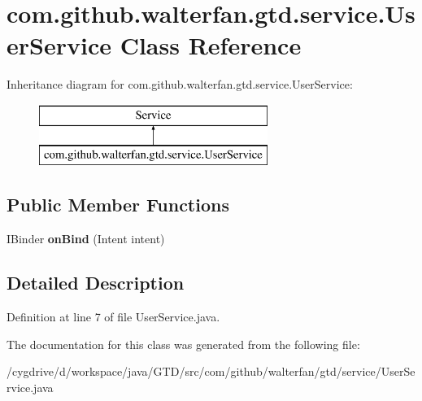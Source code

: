 \hypertarget{classcom_1_1github_1_1walterfan_1_1gtd_1_1service_1_1UserService}{\section{com.\-github.\-walterfan.\-gtd.\-service.\-User\-Service Class Reference}
\label{classcom_1_1github_1_1walterfan_1_1gtd_1_1service_1_1UserService}
}
Inheritance diagram for com.\-github.\-walterfan.\-gtd.\-service.\-User\-Service\-:\begin{figure}[H]
\begin{center}
\leavevmode
\includegraphics[height=2.000000cm]{classcom_1_1github_1_1walterfan_1_1gtd_1_1service_1_1UserService}
\end{center}
\end{figure}
\subsection*{Public Member Functions}
\begin{DoxyCompactItemize}
\item 
\hypertarget{classcom_1_1github_1_1walterfan_1_1gtd_1_1service_1_1UserService_a4d5b299bdc1ef04107330016f65954af}{I\-Binder {\bfseries on\-Bind} (Intent intent)}\label{classcom_1_1github_1_1walterfan_1_1gtd_1_1service_1_1UserService_a4d5b299bdc1ef04107330016f65954af}

\end{DoxyCompactItemize}


\subsection{Detailed Description}


Definition at line 7 of file User\-Service.\-java.



The documentation for this class was generated from the following file\-:\begin{DoxyCompactItemize}
\item 
/cygdrive/d/workspace/java/\-G\-T\-D/src/com/github/walterfan/gtd/service/User\-Service.\-java\end{DoxyCompactItemize}
